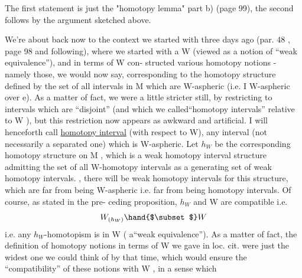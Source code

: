 
The first statement is just  the "homotopy lemma" part b)
(page 99), the second follows by the argument sketched above.

We're about back now  to the context we started with
three days ago (par. 48 , page 98 and following), where we started with
a W (viewed as a notion of ``weak equivalence''), and in terms of W con-%
structed various homotopy notions - namely those, we would now say,
corresponding to the homotopy structure defined by the set of all intervals 
in M which are W-aspheric  (i.e. I  W-aspheric over e\hand{*}). As a matter of 
fact, we were a little stricter still, by restricting to intervals
which are  ``disjoint'' (and which we called``homotopy intervals'' relative
to W ), but this restriction now  appears as awkward and artificial. I
will henceforth call \uline{homotopy interval} (with respect to W), any interval
(not necessarily a separated one) which is W-aspheric. Let $h_W$ be the
corresponding homotopy structure on M , which is a weak homotopy interval
structure admitting the set of all W-homotopy intervals as a generating
set of weak homotopy intervals. \hand{(}, there will be  weak homotopy
intervals for this structure, which are far from being W-aspheric i.e.
far from being homotopy intervals.\hand{)} Of course,  as stated in the pre-%
ceding proposition, $h_W$ and W are  compatible i.e.
\[ W_{(h_W)} \hand{$\subset$} W \]
i.e. any $h_W$-homotopism is in W ( a``weak equivalence''). As a matter of fact,
the definition of homotopy notions in terms of W we gave in loc. cit.
were just the widest one we could think of by that time, which would
ensure the ``compatibility'' of these notions with W , in a sense which
